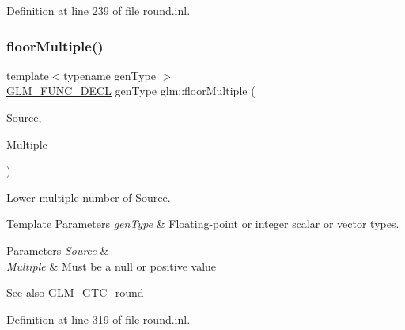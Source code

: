 Definition at line 239 of file round.\+inl.

\mbox{\label{group__gtc__round_ga9eafb9dbedf84e5cece65c2fe9d5631d}} 
\subsubsection{\texorpdfstring{floorMultiple()}{floorMultiple()}\hspace{0.1cm}{\footnotesize\ttfamily [1/2]}}
{\footnotesize\ttfamily template$<$typename gen\+Type $>$ \\
\mbox{\hyperlink{setup_8hpp_ab2d052de21a70539923e9bcbf6e83a51}{G\+L\+M\+\_\+\+F\+U\+N\+C\+\_\+\+D\+E\+CL}} gen\+Type glm\+::floor\+Multiple (\begin{DoxyParamCaption}\item[{gen\+Type}]{Source,  }\item[{gen\+Type}]{Multiple }\end{DoxyParamCaption})}

Lower multiple number of Source.


\begin{DoxyTemplParams}{Template Parameters}
{\em gen\+Type} & Floating-\/point or integer scalar or vector types. \\
\hline
\end{DoxyTemplParams}

\begin{DoxyParams}{Parameters}
{\em Source} & \\
\hline
{\em Multiple} & Must be a null or positive value\\
\hline
\end{DoxyParams}
\begin{DoxySeeAlso}{See also}
\mbox{\hyperlink{group__gtc__round}{G\+L\+M\+\_\+\+G\+T\+C\+\_\+round}} 
\end{DoxySeeAlso}


Definition at line 319 of file round.\+inl.

\mbox{\label{group__gtc__round_ga6912db42d43873fe1dedb3aed2b7a239}} 
